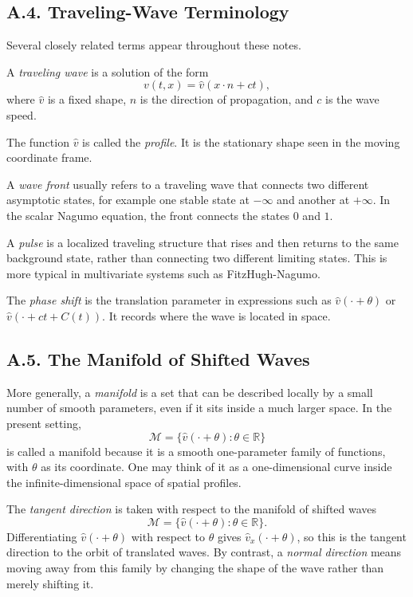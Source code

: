 \documentclass[11pt]{article}
\theoremstyle{definition}
\theoremstyle{remark}
\begin{document}
\subsection*{A.4. Traveling-Wave Terminology}
Several closely related terms appear throughout these notes.

A \emph{traveling wave} is a solution of the form
\[
v(t,x)=\hat v(x\cdot n+ct),
\]
where $\hat v$ is a fixed shape, $n$ is the direction of propagation, and $c$ is the wave speed.

The function $\hat v$ is called the \emph{profile}. It is the stationary shape seen in the moving coordinate frame.

A \emph{wave front} usually refers to a traveling wave that connects two different asymptotic states, for example one stable state at $-\infty$ and another at $+\infty$. In the scalar Nagumo equation, the front connects the states $0$ and $1$.

A \emph{pulse} is a localized traveling structure that rises and then returns to the same background state, rather than connecting two different limiting states. This is more typical in multivariate systems such as FitzHugh-Nagumo.

The \emph{phase shift} is the translation parameter in expressions such as $\hat v(\cdot+\theta)$ or $\hat v(\cdot+ct+C(t))$. It records where the wave is located in space.

\subsection*{A.5. The Manifold of Shifted Waves}
More generally, a \emph{manifold} is a set that can be described locally by a small number of smooth parameters, even if it sits inside a much larger space. In the present setting,
\[
\mathcal M=\{\hat v(\cdot+\theta):\theta\in\mathbb R\}
\]
is called a manifold because it is a smooth one-parameter family of functions, with $\theta$ as its coordinate. One may think of it as a one-dimensional curve inside the infinite-dimensional space of spatial profiles.

The \emph{tangent direction} is taken with respect to the manifold of shifted waves
\[
\mathcal M=\{\hat v(\cdot+\theta):\theta\in\mathbb R\}.
\]
Differentiating $\hat v(\cdot+\theta)$ with respect to $\theta$ gives $\hat v_x(\cdot+\theta)$, so this is the tangent direction to the orbit of translated waves.
By contrast, a \emph{normal direction} means moving away from this family by changing the shape of the wave rather than merely shifting it.
\end{document}
